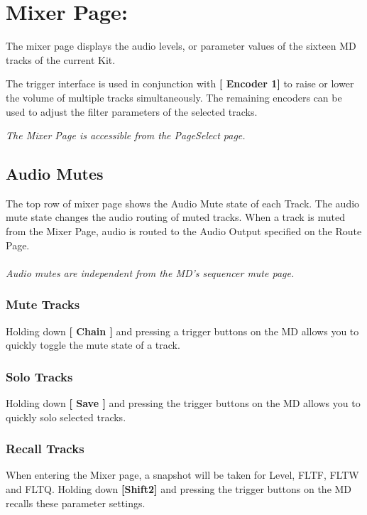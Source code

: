 \chapter{Mixer Page:}
The mixer page displays the audio levels, or parameter values of the sixteen MD tracks of the current Kit.

The trigger interface is used in conjunction with \textbf{[ Encoder 1]} to raise or lower the volume of multiple tracks simultaneously. The remaining encoders can be used to adjust the filter parameters of the selected tracks. 


\textit{The Mixer Page is accessible from the PageSelect page.}


\section{Audio Mutes}

The top row of mixer page shows the Audio Mute state of each Track. The audio mute state changes the audio routing of muted tracks. When a track is muted from the Mixer Page, audio is routed to the Audio Output specified on the Route Page.\\
\\
\textit{Audio mutes are independent from the MD's sequencer mute page.}
\subsection{Mute Tracks}
Holding down \textbf{[ Chain ]} and pressing a trigger buttons on the MD allows you to quickly toggle the mute state of a track.
\subsection{Solo Tracks}
Holding down \textbf{[ Save ]} and pressing the trigger buttons on the MD allows you to quickly solo selected tracks.
\subsection{Recall Tracks}
When entering the Mixer page, a snapshot will be taken for Level, FLTF, FLTW and FLTQ.
Holding down \textbf{[Shift2]} and pressing the trigger buttons on the MD recalls these parameter settings.
